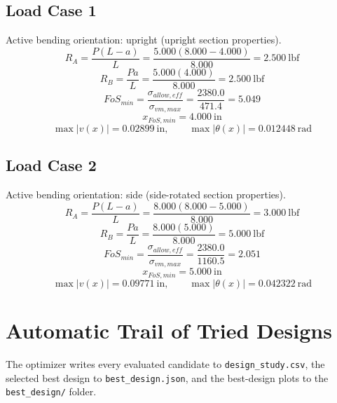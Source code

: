 \documentclass[11pt]{article}
\begin{document}
\subsection*{Load Case 1}
Active bending orientation: upright (upright section properties).
\[R_A = \frac{P(L-a)}{L} = \frac{5.000(8.000-4.000)}{8.000} = 2.500\ \mathrm{lbf}\]
\[R_B = \frac{Pa}{L} = \frac{5.000(4.000)}{8.000} = 2.500\ \mathrm{lbf}\]
\[FoS_{min} = \frac{\sigma_{allow,eff}}{\sigma_{vm,max}} = \frac{2380.0}{471.4} = 5.049\]
\[x_{FoS,min} = 4.000\ \mathrm{in}\]
\[\max |v(x)| = 0.02899\ \mathrm{in}, \qquad \max |\theta(x)| = 0.012448\ \mathrm{rad}\]
\subsection*{Load Case 2}
Active bending orientation: side (side-rotated section properties).
\[R_A = \frac{P(L-a)}{L} = \frac{8.000(8.000-5.000)}{8.000} = 3.000\ \mathrm{lbf}\]
\[R_B = \frac{Pa}{L} = \frac{8.000(5.000)}{8.000} = 5.000\ \mathrm{lbf}\]
\[FoS_{min} = \frac{\sigma_{allow,eff}}{\sigma_{vm,max}} = \frac{2380.0}{1160.5} = 2.051\]
\[x_{FoS,min} = 5.000\ \mathrm{in}\]
\[\max |v(x)| = 0.09771\ \mathrm{in}, \qquad \max |\theta(x)| = 0.042322\ \mathrm{rad}\]

\section*{Automatic Trail of Tried Designs}
The optimizer writes every evaluated candidate to \texttt{design\_study.csv}, the selected best design to \texttt{best\_design.json}, and the best-design plots to the \texttt{best\_design/} folder.
\end{document}
